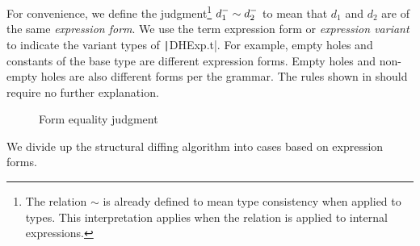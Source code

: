 For convenience, we define the judgment\footnote{The relation $\sim$ is already defined to mean type consistency when applied to types. This interpretation applies when the relation is applied to internal expressions.} $d_1^-\sim d_2^-$ to mean that $d_1$ and $d_2$ are of the same \textit{expression form}. We use the term expression form or \textit{expression variant} to indicate the variant types of \texttt|DHExp.t|. For example, empty holes and constants of the base type are different expression forms. Empty holes and non-empty holes are also different forms per the grammar. The rules shown in  should require no further explanation.

\begin{figure}
  \centering
  \begin{mdframed}
    \begin{singlespace}
      
    \end{singlespace}
  \end{mdframed}
  \caption{Form equality judgment}
  \label{fig:form-equal}
\end{figure}

We divide up the structural diffing algorithm into cases based on expression forms.

